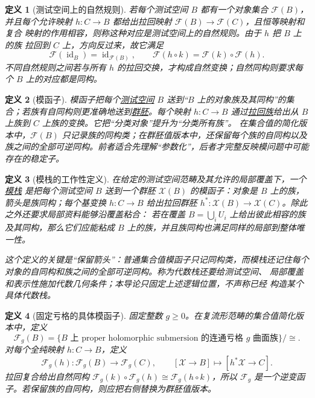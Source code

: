 \documentclass[UTF8,fontset=none,a4paper,11pt]{ctexart}
\theoremstyle{foundation-definition}
\newtheorem{definition}{定义}[section]
\theoremstyle{foundation-theorem}
\theoremstyle{foundation-proposition}
\theoremstyle{foundation-example}
\theoremstyle{foundation-remark}
\theoremstyle{foundation-theorem}
\newcommand{\term}[2]{\hyperref[#1]{#2}}
\begin{document}
\begin{definition}[测试空间上的自然规则]\label{def:test-natural}
若每个测试空间 \(B\) 都有一个对象集合 \(\mathcal F(B)\)，并且每个允许映射
\(h:C\to B\) 都给出拉回映射 \(\mathcal F(B)\to\mathcal F(C)\)，且恒等映射和复合
映射的作用相容，则称这种对应是测试空间上的自然规则。由于 \(h\) 把 \(B\) 上的族
拉回到 \(C\) 上，方向反过来，故它满足
\[
\mathcal F(\operatorname{id}_B)=\operatorname{id}_{\mathcal F(B)},\qquad
\mathcal F(h\circ k)=\mathcal F(k)\circ\mathcal F(h).
\]
不同自然规则之间若与所有 \(h\) 的拉回交换，才构成自然变换；自然同构则要求每个
\(B\) 上的对应都是同构。
\end{definition}

\begin{definition}[模函子]\label{def:moduli-functor}
模函子把每个\term{def:test-space}{测试空间} \(B\) 送到“\(B\) 上的对象族及其同构”的集合；若族有自同构则更准确地送到\term{def:groupoid}{群胚}。每个映射 \(h:C\to B\) 通过\term{def:pullback}{拉回族}给出从 \(B\) 上族到 \(C\) 上族的变换。它把“分类对象”提升为“分类所有族”。
在集合值的简化版本中，\(\mathcal F(B)\) 只记录族的同构类；在群胚值版本中，还保留每个族的自同构以及族之间的全部可逆同构。前者适合先理解“参数化”，后者才完整反映模问题中可能存在的稳定子。
\end{definition}

\begin{definition}[模栈的工作性定义]\label{def:moduli-stack}
在给定的测试空间范畴及其允许的局部覆盖下，一个\term{def:moduli-stack}{模栈}
是把每个测试空间 \(B\) 送到一个群胚 \(\mathcal X(B)\) 的模函子：对象是
\(B\) 上的族，箭头是族同构；每个基变换 \(h:C\to B\) 给出拉回群胚
\(h^*:\mathcal X(B)\to\mathcal X(C)\)。除此之外还要求局部资料能够沿覆盖粘合：
若在覆盖 \(B=\bigcup_iU_i\) 上给出彼此相容的族及其同构，那么它们应能粘成
\(B\) 上的族，并且族同构也满足同样的局部到整体唯一性。

这个定义的关键是“保留箭头”：普通集合值模函子只记同构类，而模栈还记住每个
对象的自同构和族之间的全部可逆同构。称为\emph{代数栈}还要给测试空间、
局部覆盖和表示性施加代数几何条件；本导论只固定上述逻辑位置，不声称已经
构造某个具体代数栈。
\end{definition}

\begin{definition}[固定亏格的具体模函子]\label{def:fixed-genus-moduli-functor}
固定整数 \(g\geq0\)。在复流形范畴的集合值简化版本中，定义
\[
\mathcal F_g(B)
=
\{\text{\(B\) 上 proper holomorphic submersion 的连通亏格 \(g\) 曲面族}\}/\cong.
\]
对每个全纯映射 \(h:C\to B\)，定义
\[
\mathcal F_g(h):\mathcal F_g(B)\longrightarrow\mathcal F_g(C),
\qquad
[\mathcal X\to B]\longmapsto[h^*\mathcal X\to C].
\]
拉回复合给出自然同构
\(\mathcal F_g(k)\circ\mathcal F_g(h)\cong\mathcal F_g(h\circ k)\)，所以
\(\mathcal F_g\) 是一个逆变函子。若保留族的自同构，则应把右侧替换为群胚值版本。
\end{definition}
\end{document}
